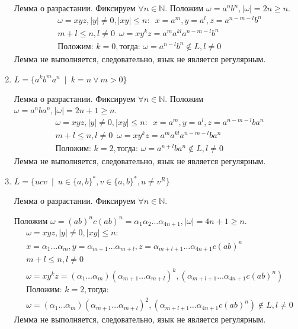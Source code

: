 \documentclass[a4paper, 12pt] {article} %
\begin{document}
\begin{enumerate}
    Лемма о разрастании. Фиксируем $\forall n \in \mathbb{N}$. Положим $\omega = a^n b^n, |\omega| = 2n \ge n$.
    \begin{align*}
        &\omega = xyz, |y| \ne 0, |xy| \le n : \enspace x = a^m, y = a^l, z = a^{n-m-l}b^n \\
        &m+l \le n, l \ne 0 \enspace \omega = xy^kz = a^{m}a^{kl}a^{n-m-l}b^n \\
        &\text{Положим: } k=0, \text{тогда: } \omega = a^{n-l}b^n \notin L, l \ne 0
    \end{align*}
    Лемма не выполняется, следовательно, язык не является регулярным. \\
    
    \item 
    $L = \{a^k b^m a^n \enspace | \enspace k = n \vee m > 0\}$
    
    Лемма о разрастании. Фиксируем $\forall n \in \mathbb{N}$. Положим $\omega = a^n ba^n, |\omega| = 2n+1 \ge n$.
    \begin{align*}
        &\omega = xyz, |y| \ne 0, |xy| \le n : \enspace x = a^m, y = a^l, z = a^{n-m-l}ba^n \\
        &m+l \le n, l \ne 0 \enspace \omega = xy^kz = a^{m}a^{kl}a^{n-m-l}ba^n \\
        &\text{Положим: } k=2, \text{тогда: } \omega = a^{n+l}ba^n \notin L, l \ne 0
    \end{align*}
    Лемма не выполняется, следовательно, язык не является регулярным. \\
    
    \item 
    $L = \{ucv \enspace | \enspace u \in \{a,b\}^*, v \in \{a,b\}^*, u \ne v^R\}$
    
    Лемма о разрастании. Фиксируем $\forall n \in \mathbb{N}$. 
    
    Положим $\omega = (ab)^n c(ab)^n = \alpha_1\alpha_2\dots\alpha_{4n+1}, |\omega| = 4n+1 \ge n$.
    \begin{align*}
        &\omega = xyz, |y| \ne 0, |xy| \le n : \\
        &x = \alpha_1\dots\alpha_m, y = \alpha_{m+1}\dots\alpha_{m+l}, z = \alpha_{m+l+1}\dots\alpha_{4n+1} c(ab)^n \\
        &m+l \le n, l \ne 0 \\
        &\omega = xy^kz = (\alpha_1\dots\alpha_m)(\alpha_{m+1}\dots\alpha_{m+l})^k, 
        (\alpha_{m+l+1}\dots\alpha_{4n+1} c(ab)^n) \\
        &\text{Положим: } k=2, \text{тогда: } \\
        &\omega = (\alpha_1\dots\alpha_m)(\alpha_{m+1}\dots\alpha_{m+l})^2, 
        (\alpha_{m+l+1}\dots\alpha_{4n+1} c(ab)^n) \notin L, l \ne 0
    \end{align*}
    Лемма не выполняется, следовательно, язык не является регулярным. \\
\end{enumerate}
\end{document}

